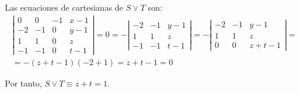 \begin{ejercicio}
    Las ecuaciones de cartesianas de $S\vee T$ son:
    \begin{multline*}
        \left|\begin{array}{cccc}
            0 & 0 & -1 & x-1 \\
            -2 & -1 & 0 & y-1 \\
            1 & 1 & 0 & z \\
            -1 & -1 & 0 & t-1
        \end{array}\right| = 0
        = -\left|\begin{array}{ccc}
            -2 & -1 & y-1 \\
            1 & 1 & z \\
            -1 & -1 & t-1
        \end{array}\right|
        = -\left|\begin{array}{ccc}
            -2 & -1 & y-1 \\
            1 & 1 & z \\
            0 & 0 & z+t-1
        \end{array}\right|
        =\\= -(z+t-1)(-2+1) = z+t-1=0
    \end{multline*}
    
    Por tanto, $S\vee T \equiv z+t=1$.
\end{ejercicio}

